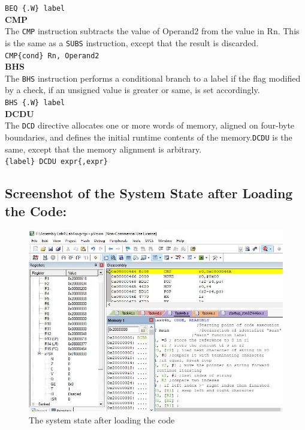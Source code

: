 \documentclass[12pt]{article}
\begin{document}
\verb|BEQ {.W} label|\\
\textbf{CMP}\\
The \verb|CMP| instruction subtracts the value of Operand2 from the value in Rn. This is the same as a \verb|SUBS| instruction, except that the result is discarded.\\
\verb|CMP{cond} Rn, Operand2|\\
\textbf{BHS}\\
The \verb|BHS| instruction performs a conditional branch to a label if the flag modified by a check, if an unsigned value is greater or same, is set accordingly.\\
\verb|BHS {.W} label|\\
\textbf{DCDU}\\
The \verb|DCD| directive allocates one or more words of memory, aligned on four-byte boundaries, and defines the initial runtime contents of the memory.\verb|DCDU| is the same, except that the memory alignment is arbitrary.\\
\verb|{label} DCDU expr{,expr}|\\

\subsection{Screenshot of the System State after Loading the Code:}
\begin{figure}[ht]
     \centering
     \includegraphics[scale=.7]{images/beforetask4b.JPG}
     \caption{The system state after loading the code}
     \label{fig:before_task_four_b}
 \end{figure}
 \pagebreak
\end{document}
